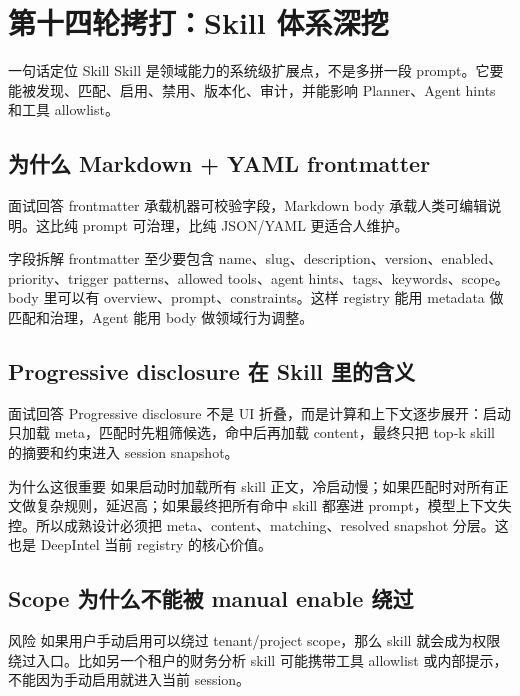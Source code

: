 \section{第十四轮拷打：Skill 体系深挖}

\begin{summaryBox}{一句话定位 Skill}
Skill 是领域能力的系统级扩展点，不是多拼一段 prompt。它要能被发现、匹配、启用、禁用、版本化、审计，并能影响 Planner、Agent hints 和工具 allowlist。
\end{summaryBox}

\subsection{为什么 Markdown + YAML frontmatter}
\begin{qaBox}{面试回答}
frontmatter 承载机器可校验字段，Markdown body 承载人类可编辑说明。这比纯 prompt 可治理，比纯 JSON/YAML 更适合人维护。
\end{qaBox}

\begin{analysisBox}{字段拆解}
frontmatter 至少要包含 name、slug、description、version、enabled、priority、trigger patterns、allowed tools、agent hints、tags、keywords、scope。body 里可以有 overview、prompt、constraints。这样 registry 能用 metadata 做匹配和治理，Agent 能用 body 做领域行为调整。
\end{analysisBox}

\subsection{Progressive disclosure 在 Skill 里的含义}
\begin{qaBox}{面试回答}
Progressive disclosure 不是 UI 折叠，而是计算和上下文逐步展开：启动只加载 meta，匹配时先粗筛候选，命中后再加载 content，最终只把 top-k skill 的摘要和约束进入 session snapshot。
\end{qaBox}

\begin{analysisBox}{为什么这很重要}
如果启动时加载所有 skill 正文，冷启动慢；如果匹配时对所有正文做复杂规则，延迟高；如果最终把所有命中 skill 都塞进 prompt，模型上下文失控。所以成熟设计必须把 meta、content、matching、resolved snapshot 分层。这也是 DeepIntel 当前 registry 的核心价值。
\end{analysisBox}

\subsection{Scope 为什么不能被 manual enable 绕过}
\begin{riskBox}{风险}
如果用户手动启用可以绕过 tenant/project scope，那么 skill 就会成为权限绕过入口。比如另一个租户的财务分析 skill 可能携带工具 allowlist 或内部提示，不能因为手动启用就进入当前 session。
\end{riskBox}

